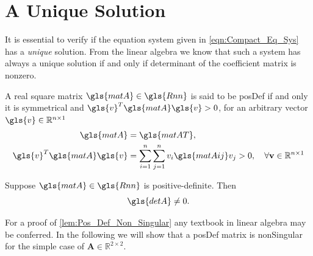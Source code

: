 \section{A Unique Solution}
It is essential to verify if the equation system given in \cref{eqn:Compact_Eq_Sys} has a
\emph{unique} solution. From the linear algebra we know that such a system has always a
unique solution if and only if determinant of the coefficient matrix is nonzero.

\begin{definition} \label{def:Positive_Definite}
	A real square matrix $\gls{matA} \in \gls{Rnn}$ is said to be \gls{posDef} if and only it is symmetrical and
	$\gls{v}^{T} \gls{matA} \gls{v} > 0$, for an arbitrary vector $\gls{v} \in \mathbb{R}^{n \times 1}$
	\begin{subequations}
		\begin{align}
			\gls{matA} &= \gls{matAT}, \label{eqn:Pos_Def_Prop_1} \\
			\gls{v}^{T} \gls{matA} \gls{v} &= \sum \limits_{i = 1}^{n} \sum \limits_{j = 1}^{n} v_{i}  \gls{matAij} v_{j} > 0,
				\quad \forall \mathbf{v} \in \mathbb{R}^{n \times 1} \label{eqn:Pos_Def_Prop_2}
		\end{align}
	\end{subequations}
\end{definition}
\begin{lemma} \label{lem:Pos_Def_Non_Singular}
	Suppose $\gls{matA} \in \gls{Rnn}$ is positive-definite. Then
	\begin{equation}
		\gls{detA} \neq 0.
	\end{equation}
\end{lemma}
For a proof of \cref{lem:Pos_Def_Non_Singular} any textbook in linear algebra may be conferred. In the following we will show
that a \gls{posDef} matrix is \gls{nonSingular} for the simple case of $\mathbf{A} \in \mathbb{R}^{2 \times 2}$.
